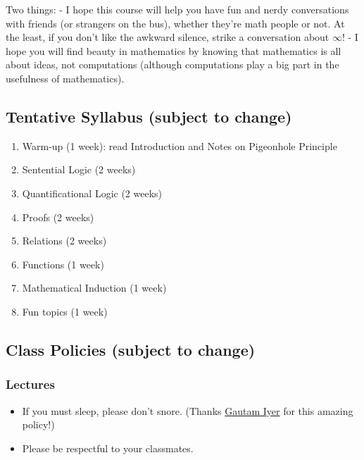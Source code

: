 \documentclass[
]{article}
\providecommand{\tightlist}{%
  \setlength{\itemsep}{0pt}\setlength{\parskip}{0pt}}
\begin{document}
Two things:
- I hope this course will help you have fun and nerdy conversations with friends (or strangers on the bus), whether they're math people or not.
At the least, if you don't like the awkward silence, strike a conversation about \(\infty\)!
- I hope you will find beauty in mathematics by knowing that mathematics is all about ideas,
not computations (although computations play a big part in the usefulness of mathematics).

\hypertarget{tentative-syllabus-subject-to-change}{%
\subsection*{Tentative Syllabus (subject to change)}\label{tentative-syllabus-subject-to-change}}

\begin{enumerate}
\def\labelenumi{\arabic{enumi}.}
\item
  Warm-up (1 week): read Introduction and Notes on Pigeonhole Principle
\item
  Sentential Logic (2 weeks)
\item
  Quantificational Logic (2 weeks)
\item
  Proofs (2 weeks)
\item
  Relations (2 weeks)
\item
  Functions (1 week)
\item
  Mathematical Induction (1 week)
\item
  Fun topics (1 week)
\end{enumerate}

\hypertarget{class-policies-subject-to-change}{%
\subsection*{Class Policies (subject to change)}\label{class-policies-subject-to-change}}

\hypertarget{lectures}{%
\subsubsection*{Lectures}\label{lectures}}

\begin{itemize}
\tightlist
\item
  If you must sleep, please don't snore. (Thanks \href{https://www.math.cmu.edu/~gautam/}{Gautam Iyer} for this amazing policy!)
\item
  Please be respectful to your classmates.
\end{itemize}
\end{document}
